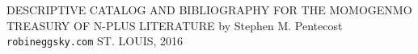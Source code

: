 \newpage
\begin{center}
\vspace*{5mm}
{\Huge
DESCRIPTIVE CATALOG
\linebreak
\linebreak
AND
\linebreak
\linebreak
BIBLIOGRAPHY
\linebreak
\linebreak
FOR THE
\linebreak
\linebreak
MOMOGENMO TREASURY
\linebreak
\linebreak
OF
\linebreak
\linebreak
N-PLUS LITERATURE
\linebreak
\linebreak
}
{\Large
\linebreak
\linebreak
\linebreak
by
\linebreak
\linebreak
}
{\huge
Stephen M. Pentecost
}
\linebreak
\linebreak
\linebreak
\linebreak
{\LARGE 
\texttt{robineggsky.com}
}
\linebreak
\linebreak
{\Large 
ST. LOUIS, 2016
}
\end{center}
